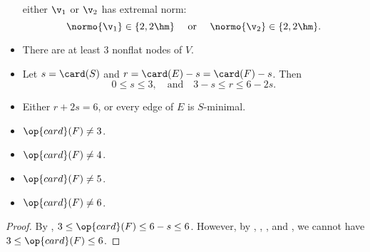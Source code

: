 \begin{lemma}
\begin{itemize}
either $\v_1$ or $\v_2$ has extremal norm:
\begin{displaymath}\normo{\v_1}\in \{2,2\hm\}\quad\text{ or }\quad
\normo{\v_2}\in \{2,2\hm\}.\end{displaymath}
\item {} There are at least $3$ nonflat nodes of $V$.
\item {} %
Let      $s=\card(S)$ and $r=\card(E) - s = \card(F)-s$.  Then
\begin{displaymath}0\le s \le 3,\quad\text{and}\quad3-s \le r \le 6 -
2s.\end{displaymath}
\item {} Either $r+2s = 6$, or every edge of $E$ is $S$-minimal.
\item {} $\op{card}(F) \ne 3$.
\item {} $\op{card}(F) \ne 4$.
\item {} $\op{card}(F) \ne 5$.
\item {} $\op{card}(F) \ne 6$.
\end{itemize}
\end{lemma}

\begin{proof}
By ,   $3\le\op{card}(F)\le 6-s\le 6$.  However, by ,
, , and , we cannot have
$3\le\op{card}(F)\le 6$.
\end{proof}



